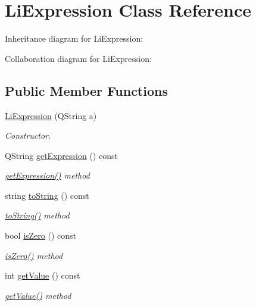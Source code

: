 \hypertarget{class_li_expression}{}\section{Li\+Expression Class Reference}
\label{class_li_expression}


Inheritance diagram for Li\+Expression\+:


Collaboration diagram for Li\+Expression\+:
\subsection*{Public Member Functions}
\begin{DoxyCompactItemize}
\item 
\hyperlink{class_li_expression_a33617047988cf710ee800aa463485e27}{Li\+Expression} (Q\+String a)
\begin{DoxyCompactList}\small\item\em Constructor. \end{DoxyCompactList}\item 
Q\+String \hyperlink{class_li_expression_a0bd7e53567dc458d662a225fbd0d3085}{get\+Expression} () const 
\begin{DoxyCompactList}\small\item\em \hyperlink{class_li_expression_a0bd7e53567dc458d662a225fbd0d3085}{get\+Expression()} method \end{DoxyCompactList}\item 
string \hyperlink{class_li_expression_afbf36946d48981027d8af7685c950a9b}{to\+String} () const 
\begin{DoxyCompactList}\small\item\em \hyperlink{class_li_expression_afbf36946d48981027d8af7685c950a9b}{to\+String()} method \end{DoxyCompactList}\item 
bool \hyperlink{class_li_expression_ac6e982f0986c28b01a1221830bce20eb}{is\+Zero} () const 
\begin{DoxyCompactList}\small\item\em \hyperlink{class_li_expression_ac6e982f0986c28b01a1221830bce20eb}{is\+Zero()} method \end{DoxyCompactList}\item 
int \hyperlink{class_li_expression_a17e0a77c27727e85d3784527c217827e}{get\+Value} () const 
\begin{DoxyCompactList}\small\item\em \hyperlink{class_li_expression_a17e0a77c27727e85d3784527c217827e}{get\+Value()} method \end{DoxyCompactList}\item 

\end{DoxyCompactItemize}
